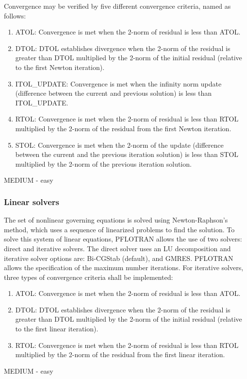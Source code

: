 Convergence may be verified by five different convergence criteria, named as follows:
\begin{enumerate}[label=NM \arabic*.,ref=NM \arabic*,nosep, resume]
	\item ATOL: \label{nonlinearATOL} Convergence is met when the 2-norm of residual is less than ATOL.
	\item DTOL:\label{nonlinearDTOL} DTOL establishes divergence when the 2-norm of the residual is greater than DTOL multiplied by the 2-norm of the initial residual (relative to the first Newton iteration).
	\item ITOL\_UPDATE:\label{nonlinearITOL} Convergence is met when the infinity norm update (difference between the current and previous solution) is less than ITOL\_UPDATE.
	\item RTOL:\label{nonlinearRTOL} Convergence is met when the 2-norm of residual is less than RTOL multiplied by the 2-norm of the residual from the first Newton iteration.
	\item STOL:\label{nonlinearSTOL} Convergence is met when the 2-norm of the update (difference between the current and the previous iteration solution) is less than STOL multiplied by the 2-norm of the previous iteration solution.
\end{enumerate}
MEDIUM - easy

\subsubsection{Linear solvers}
The set of nonlinear governing equations is solved using Newton-Raphson’s method, which uses a sequence of linearized problems to find the solution. To solve this system of linear equations, PFLOTRAN allows the use of two solvers: direct and iterative solvers. The direct solver uses an LU decomposition and iterative solver options are: Bi-CGStab (default), and GMRES. PFLOTRAN allows the specification of the maximum number iterations. 
For iterative solvers, three types of convergence criteria shall be implemented:
\begin{enumerate}[label=NM \arabic*.,ref=NM \arabic*,nosep, resume]
	\item ATOL: \label{linearATOL} Convergence is met when the 2-norm of residual is less than ATOL.
	\item DTOL:\label{linearDTOL} DTOL establishes divergence when the 2-norm of the residual is greater than DTOL multiplied by the 2-norm of the initial residual (relative to the first linear iteration).
	\item RTOL:\label{linearRTOL} Convergence is met when the 2-norm of residual is less than RTOL multiplied by the 2-norm of the residual from the first linear iteration.
\end{enumerate}
MEDIUM - easy

